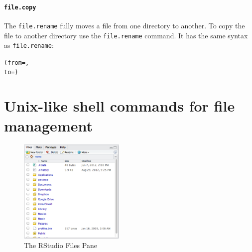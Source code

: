 \documentclass[krantz1]{krantz}
\begin{document}
\paragraph{{\tt{file.copy}}}

The \texttt{file.rename} fully moves a file from one directory to another. To copy the file to another directory use the \texttt{file.rename} command. It has the same syntax as \texttt{file.rename}:

\begin{knitrout}
\color{fgcolor}\begin{kframe}
\begin{alltt}
(from = , 
            to = )
\end{alltt}
\end{kframe}
\end{knitrout}


\section{Unix-like shell commands for file management} 

\begin{figure}
    \caption{The RStudio Files Pane} %
    \label{FilesPane}
        \begin{center}    
        \includegraphics[width=0.45\textwidth]{Children/Chapter4/images4/RStudioFiles.png}
        \end{center}
\end{figure}
\end{document}
